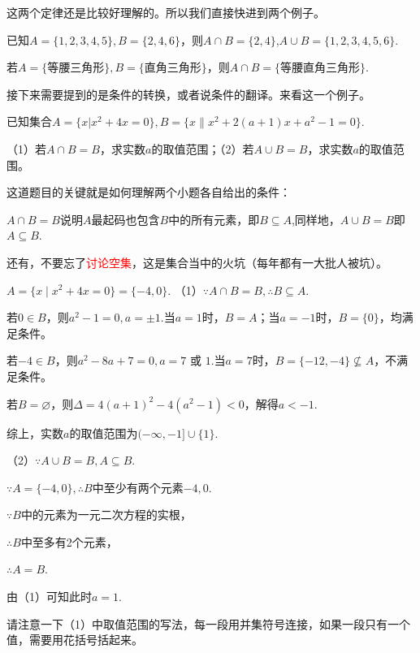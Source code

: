 \documentclass[lang=cn,math=cm,chinesefont=nofont,11pt,scheme=chinese,onecol]{elegantbook}
\begin{document}
这两个定律还是比较好理解的。所以我们直接快进到两个例子。

\begin{example}
  已知$A=\{1,2,3,4,5\},B=\{2,4,6\}$，则$A\cap B=\{2,4\}$,$A\cup B=\{1,2,3,4,5,6\}$.
\end{example}

\begin{example}
  若$A=\{\text{等腰三角形}\},B=\{\text{直角三角形}\}$，则$A\cap B=\{\text{等腰直角三角形}\}.$
\end{example}

\hspace*{\fill}

接下来需要提到的是条件的转换，或者说条件的翻译。来看这一个例子。
\begin{example}
  已知集合$A=\{x|x^{2}+4x=0\},B=\{x\|x^{2}+2(a+1)x+a^{2}-1=0\}.$

  （1）若$A\cap B=B$，求实数$a$的取值范围；（2）若$A\cup B=B$，求实数$a$的取值范围。
\end{example}
\begin{remark}
  这道题目的关键就是如何理解两个小题各自给出的条件：

  $A\cap B=B$说明$A$最起码也包含$B$中的所有元素，即$B\subseteq A$,同样地，$A\cup B=B$即$A\subseteq B$.

  还有，不要忘了\textcolor{red}{讨论空集}，这是集合当中的火坑（每年都有一大批人被坑）。
\end{remark}
\begin{solution}
  $A=\{x\mid x^{2}+4x=0\}=\{-4,0\}.$
  （1）$\because A\cap B=B,$\enspace$\therefore B\subseteq A.$
  
  若$0\in B$，则$a^2-1=0,a=\pm 1.$当$a=1$时，$B=A$；当$a=-1$时，$B=\{0\}$，均满足条件。

  若$-4\in B$，则$a^2-8a+7=0,a=7\text{ 或 }1.$当$a=7$时，$B=\{-12,-4\}\nsubseteq A$，不满足条件。

  若$B=\varnothing$，则$\Delta=4(a+1)^{2}-4(a^{2}-1)<0$，解得$a<-1$.

  综上，实数$a$的取值范围为$(-\infty,-1]\cup\{1\}.$

  （2）$\because A\cup B=B,$\enspace$A\subseteq B.$

  $\because A=\{-4,0\},$\enspace$\therefore B$中至少有两个元素$-4,0.$

  $\because B$中的元素为一元二次方程的实根，

  $\therefore B$中至多有2个元素，

  $\therefore A=B.$

  由（1）可知此时$a=1$.
\end{solution}
\begin{remark}
  请注意一下（1）中取值范围的写法，每一段用并集符号连接，如果一段只有一个值，需要用花括号括起来。
\end{remark}
\end{document}
